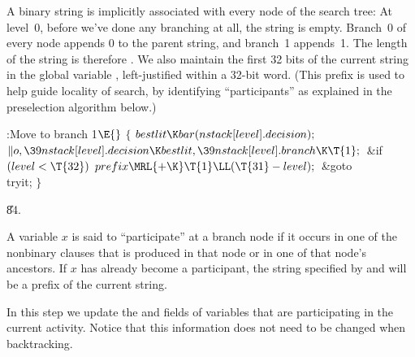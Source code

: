 A binary string is implicitly associated with every node of
the search tree:
At level~0, before we've done any branching at all, the string is empty.
Branch~0 of every node appends 0 to the parent string, and branch~1 appends~1.
The length of the string is therefore . We also maintain the
first 32 bits of the current string in the global variable ,
left-justified within a 32-bit word. (This prefix is used to help guide
locality of search, by identifying ``participants''
as explained in the preselection algorithm below.)

\Y\B\4:Move to branch 1\X${}\E{}$\6
${}\{{}$\1\6
${}\\{bestlit}\K\\{bar}(\\{nstack}[\\{level}].\\{decision});{}$\6
${}\|o,\39\\{nstack}[\\{level}].\\{decision}\K\\{bestlit},\39\\{nstack}[%
\\{level}].\\{branch}\K\T{1};{}$\6
\&{if} ${}(\\{level}<\T{32}){}$\1\5
${}\\{prefix}\MRL{+{\K}}\T{1}\LL(\T{31}-\\{level});{}$\2\6
\&{goto} \\{tryit};\6
\4${}\}{}$\2\par
\U84.\fi

A variable $x$ is said to ``participate'' at a branch node
if it
occurs in one of the nonbinary clauses that is produced in that node or in
one of that node's ancestors. If $x$ has already become a participant, the
string specified by  and  will be a
prefix of the current string.

In this step we update the  and  fields of variables
that
are participating in the current activity. Notice that this
information does not need to be changed when backtracking.

